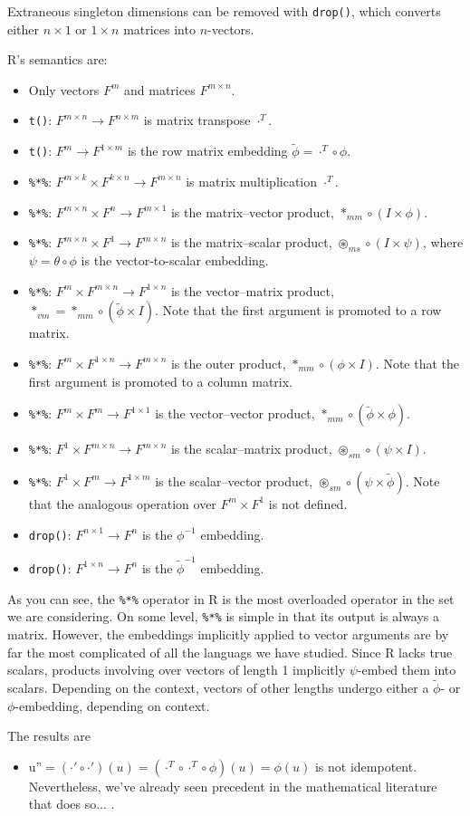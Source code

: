 Extraneous singleton dimensions can be removed with \verb`drop()`,
which converts either $n\times1$ or $1\times n$ matrices into $n$-vectors.

R's semantics are:
\begin{itemize}
\item Only vectors $F^{m}$ and matrices $F^{m\times n}$.
\item \verb`t()`: $F^{m\times n}\rightarrow F^{n\times m}$ is matrix transpose
$\cdot^{T}$.
\item \verb`t()`: $F^{m}\rightarrow F^{1\times m}$ is the row matrix embedding
$\tilde{\phi}=\cdot^{T}\circ\phi$.
\item \verb`%*%`: $F^{m\times k}\times F^{k\times n}\rightarrow F^{m\times n}$
is matrix multiplication $\cdot^{T}$.
\item \verb`%*%`: $F^{m\times n}\times F^{n}\rightarrow F^{m\times1}$
is the matrix–vector product, $*_{mm}\circ\left(I\times\phi\right)$.
\item \verb`%*%`: $F^{m\times n}\times F^{1}\rightarrow F^{m\times n}$
is the matrix–scalar product, $\circledast_{ms}\circ\left(I\times\psi\right)$,
where $\psi=\theta\circ\phi$ is the vector-to-scalar embedding.
\item \verb`%*%`: $F^{m}\times F^{m\times n}\rightarrow F^{1\times n}$
is the vector–matrix product, $*_{vm}=*_{mm}\circ\left(\tilde{\phi}\times I\right)$.
Note that the first argument is promoted to a row matrix.
\item \verb`%*%`: $F^{m}\times F^{1\times n}\rightarrow F^{m\times n}$
is the outer product, $*_{mm}\circ\left(\phi\times I\right)$. Note
that the first argument is promoted to a column matrix.
\item \verb`%*%`: $F^{m}\times F^{m}\rightarrow F^{1\times1}$ is the vector–vector
product, $*_{mm}\circ\left(\tilde{\phi}\times\phi\right)$.
\item \verb`%*%`: $F^{1}\times F^{m\times n}\rightarrow F^{m\times n}$
is the scalar–matrix product, $\circledast_{sm}\circ\left(\psi\times I\right)$.
\item \verb`%*%`: $F^{1}\times F^{m}\rightarrow F^{1\times m}$ is the
scalar–vector product, $\circledast_{sm}\circ\left(\psi\times\tilde{\phi}\right)$.
Note that the analogous operation over $F^{m}\times F^{1}$ is not
defined.
\item \verb`drop()`: $F^{n\times1}\rightarrow F^{n}$ is the $\phi^{-1}$
embedding.
\item \verb`drop()`: $F^{1\times n}\rightarrow F^{n}$ is the $\tilde{\phi}^{-1}$
embedding.
\end{itemize}
As you can see, the \verb`%*%` operator in R is the most overloaded
operator in the set we are considering. On some level, \verb`%*%`
is simple in that its output is always a matrix. However, the embeddings
implicitly applied to vector arguments are by far the most complicated
of all the languags we have studied. Since R lacks true scalars, products
involving over vectors of length 1 implicitly $\psi$-embed them into
scalars. Depending on the context, vectors of other lengths undergo
either a $\tilde{\phi}$- or $\phi$-embedding, depending on context.

The results are
\begin{itemize}
\item u''$=\left(\cdot'\circ\cdot'\right)\left(u\right)=\left(\cdot^{T}\circ\cdot^{T}\circ\phi\right)\left(u\right)=\phi\left(u\right)$
is not idempotent. Nevertheless, we've already seen precedent in the
mathematical literature that does so... .
\end{itemize}
